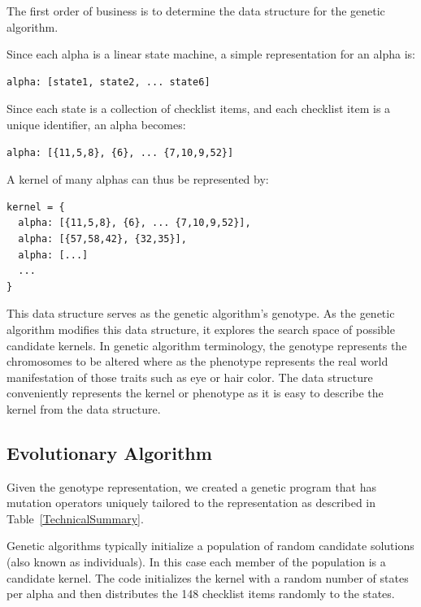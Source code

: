 \documentclass[conference]{IEEEtran}
\begin{document}
The first order of business is to determine the data structure for the genetic algorithm.

Since each alpha is a linear state machine, a simple representation for an alpha is: 
\begin{verbatim}
alpha: [state1, state2, ... state6] 
\end{verbatim}


Since each state is a collection of checklist items, and each checklist item is a unique identifier, an alpha becomes:

\begin{verbatim}
alpha: [{11,5,8}, {6}, ... {7,10,9,52}]
\end{verbatim}

A kernel of many alphas can thus be represented by:

\begin{verbatim}
kernel = {
  alpha: [{11,5,8}, {6}, ... {7,10,9,52}],
  alpha: [{57,58,42}, {32,35}],
  alpha: [...]
  ...
}
\end{verbatim}

This data structure serves as the genetic algorithm's genotype. As the genetic algorithm modifies this data structure, it explores the search space of possible candidate kernels. In genetic algorithm terminology, the genotype represents the chromosomes to be altered where as the phenotype represents the real world manifestation of those traits such as eye or hair color. The data structure conveniently represents the kernel or phenotype as it is easy to describe the kernel from the data structure.\cite{Eiben2003} 

\subsection{Evolutionary Algorithm}
\label{Evolutionary Algorithm}

Given the genotype representation, we created a genetic program that has mutation operators uniquely tailored to the representation as described in Table~\ref{TechnicalSummary}.

Genetic algorithms typically initialize a population of random candidate solutions (also known as individuals). In this case each member of the population is a candidate kernel. The code initializes the kernel with a random number of states per alpha and then distributes the 148 checklist items randomly to the states. 
\end{document}
